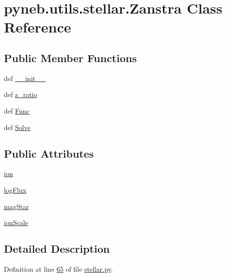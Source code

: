 \hypertarget{classpyneb_1_1utils_1_1stellar_1_1_zanstra}{\section{pyneb.\-utils.\-stellar.\-Zanstra Class Reference}
\label{classpyneb_1_1utils_1_1stellar_1_1_zanstra}
}
\subsection*{Public Member Functions}
\begin{DoxyCompactItemize}
\item 
def \hyperlink{classpyneb_1_1utils_1_1stellar_1_1_zanstra_a2316eead01f32d876ea59a1b02a669c0}{\-\_\-\-\_\-init\-\_\-\-\_\-}
\item 
def \hyperlink{classpyneb_1_1utils_1_1stellar_1_1_zanstra_a33d4960cdb38f6a25972f20da8d146d1}{z\-\_\-ratio}
\item 
def \hyperlink{classpyneb_1_1utils_1_1stellar_1_1_zanstra_abb29e7f875d83a00e081726574eae202}{Func}
\item 
def \hyperlink{classpyneb_1_1utils_1_1stellar_1_1_zanstra_adbf52e2c709bd164b518256b61789840}{Solve}
\end{DoxyCompactItemize}
\subsection*{Public Attributes}
\begin{DoxyCompactItemize}
\item 
\hyperlink{classpyneb_1_1utils_1_1stellar_1_1_zanstra_a48c1797d46d49841c8b3a9275679e3ae}{ion}
\item 
\hyperlink{classpyneb_1_1utils_1_1stellar_1_1_zanstra_a8c4fddabe252ad4c539244ace4e79227}{log\-Flux}
\item 
\hyperlink{classpyneb_1_1utils_1_1stellar_1_1_zanstra_af635b1b8ca29b1b956b91e93f63fdf76}{mag\-Star}
\item 
\hyperlink{classpyneb_1_1utils_1_1stellar_1_1_zanstra_a8f04a2133b2acf4641a2ce08db7fc100}{ion\-Scale}
\end{DoxyCompactItemize}


\subsection{Detailed Description}


Definition at line \hyperlink{stellar_8py_source_l00065}{65} of file \hyperlink{stellar_8py_source}{stellar.\-py}.



